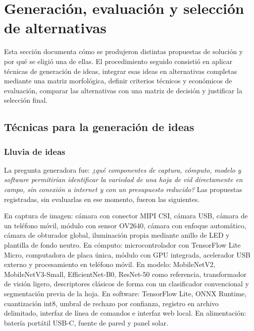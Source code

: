 \section{Generación, evaluación y selección de alternativas}

Esta sección documenta cómo se produjeron distintas propuestas de solución y
por qué se eligió una de ellas. El procedimiento seguido consistió en aplicar
técnicas de generación de ideas, integrar esas ideas en alternativas
completas mediante una matriz morfológica, definir criterios técnicos y
económicos de evaluación, comparar las alternativas con una matriz de
decisión y justificar la selección final.

\subsection{Técnicas para la generación de ideas}

\subsubsection{Lluvia de ideas}

La pregunta generadora fue: \textit{¿qué componentes de captura, cómputo,
modelo y software permitirían identificar la variedad de una hoja de vid
directamente en campo, sin conexión a internet y con un presupuesto
reducido?} Las propuestas registradas, sin evaluarlas en ese momento, fueron
las siguientes.

En captura de imagen: cámara con conector MIPI CSI, cámara USB, cámara de un
teléfono móvil, módulo con sensor OV2640, cámara con enfoque automático,
cámara de obturador global, iluminación propia mediante anillo de LED y
plantilla de fondo neutro. En cómputo: microcontrolador con TensorFlow Lite
Micro, computadora de placa única, módulo con GPU integrada, acelerador USB
externo y procesamiento en teléfono móvil. En modelo: MobileNetV2,
MobileNetV3-Small, EfficientNet-B0, ResNet-50 como referencia, transformador
de visión ligero, descriptores clásicos de forma con un clasificador
convencional y segmentación previa de la hoja. En software: TensorFlow Lite,
ONNX Runtime, cuantización int8, umbral de rechazo por confianza, registro en
archivo delimitado, interfaz de línea de comandos e interfaz web local. En
alimentación: batería portátil USB-C, fuente de pared y panel solar.

